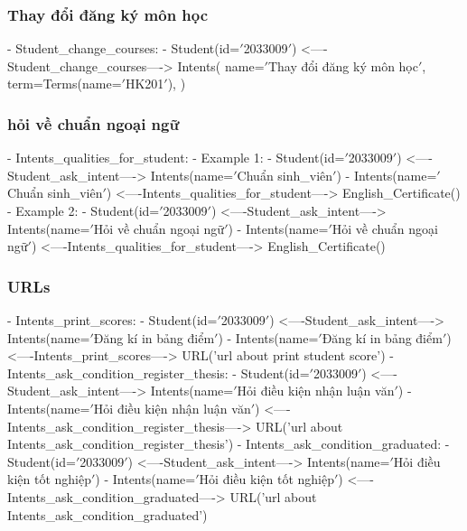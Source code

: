             \subsubsection{Thay đổi đăng ký môn học}
            - Student\_change\_courses:
                - Student(id=\('\)2033009\('\))
                  <----Student\_change\_courses---->
                  Intents(
                  name=\('\)Thay đổi đăng ký môn học\('\),
                  term=Terms(name=\('\)HK201\('\)),
                  )
            \subsubsection{hỏi về chuẩn ngoại ngữ}
            - Intents\_qualities\_for\_student:
                - Example 1:
                  - Student(id=\('\)2033009\('\)) <----Student\_ask\_intent----> Intents(name=\('\)Chuẩn sinh\_viên\('\))
                  - Intents(name=\('\)Chuẩn sinh\_viên\('\)) <----Intents\_qualities\_for\_student----> English\_Certificate()
                - Example 2:
                  - Student(id=\('\)2033009\('\)) <----Student\_ask\_intent----> Intents(name=\('\)Hỏi về chuẩn ngoại ngữ\('\))
                  - Intents(name=\('\)Hỏi về chuẩn ngoại ngữ\('\)) <----Intents\_qualities\_for\_student----> English\_Certificate()
            \subsubsection{URLs}
            - Intents\_print\_scores:
                  - Student(id=\('\)2033009\('\)) <----Student\_ask\_intent----> Intents(name=\('\)Đăng kí in bảng điểm\('\))
                  - Intents(name=\('\)Đăng kí in bảng điểm\('\)) <----Intents\_print\_scores----> URL('url about print student score')
            - Intents\_ask\_condition\_register\_thesis:
                  - Student(id=\('\)2033009\('\)) <----Student\_ask\_intent----> Intents(name=\('\)Hỏi điều kiện nhận luận văn\('\))
                  - Intents(name=\('\)Hỏi điều kiện nhận luận văn\('\)) <----Intents\_ask\_condition\_register\_thesis----> URL('url about Intents\_ask\_condition\_register\_thesis')
            - Intents\_ask\_condition\_graduated:
                  - Student(id=\('\)2033009\('\)) <----Student\_ask\_intent----> Intents(name=\('\)Hỏi điều kiện tốt nghiệp\('\))
                  - Intents(name=\('\)Hỏi điều kiện tốt nghiệp\('\)) <----Intents\_ask\_condition\_graduated----> URL('url about Intents\_ask\_condition\_graduated')
